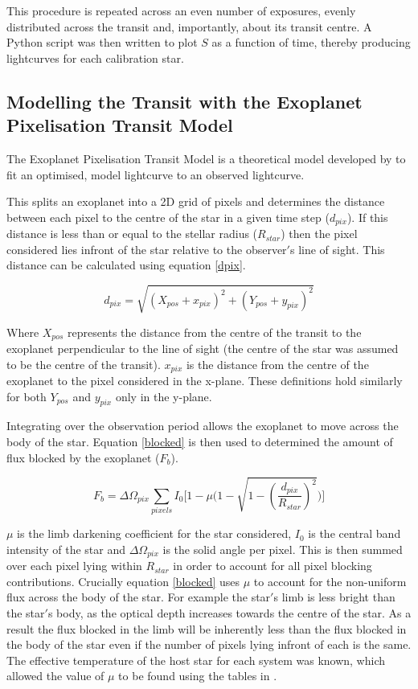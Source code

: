 \documentclass{report}
\begin{document}
This procedure is repeated across an even number of exposures, evenly distributed across the transit and, importantly, about its transit centre. A Python script was then written to plot $S$ as a function of time, thereby producing lightcurves for each calibration star.

\subsection{Modelling the Transit with the Exoplanet Pixelisation Transit Model}

The Exoplanet Pixelisation Transit Model is a theoretical model developed by \textcite{model} to fit an optimised, model lightcurve to an observed lightcurve.

This splits an exoplanet into a 2D grid of pixels and determines the distance between each pixel to the centre of the star in a given time step ($d_{pix}$). If this distance is less than or equal to the stellar radius ($R_{star}$) then the pixel considered lies infront of the star relative to the observer$'$s line of sight. This distance can be calculated using equation \ref{dpix}.

\begin{equation} \label{dpix}
    d_{pix} = \sqrt{(X_{pos} + x_{pix})^2 + (Y_{pos} + y_{pix})^2}
\end{equation}

Where $X_{pos}$ represents the distance from the centre of the transit to the exoplanet perpendicular to the line of sight (the centre of the star was assumed to be the centre of the transit). $x_{pix}$ is the distance from the centre of the exoplanet to the pixel considered in the x-plane. These definitions hold similarly for both $Y_{pos}$ and $y_{pix}$ only in the y-plane.

Integrating over the observation period allows the exoplanet to move across the body of the star. Equation \ref{blocked} is then used to determined the amount of flux blocked by the exoplanet ($F_{b}$). 

\begin{equation} \label{blocked}
    F_{b} = \Delta \Omega_{pix} \sum_{pixels} I_{0}\Bigg[1-\mu\Bigg(1-\sqrt{1-\left(\frac{d_{pix}}{R_{star}}\right)^{2}}\Bigg)\Bigg]
\end{equation}

$\mu$ is the limb darkening coefficient for the star considered, $I_{0}$ is the central band intensity of the star and $\Delta\Omega_{pix}$ is the solid angle per pixel. This is then summed over each pixel lying within $R_{star}$ in order to account for all pixel blocking contributions. Crucially equation \ref{blocked} uses $\mu$ to account for the non-uniform flux across the body of the star. For example the star$'$s limb is less bright than the star$'$s body, as the optical depth increases towards the centre of the star. As a result the flux blocked in the limb will be inherently less than the flux blocked in the body of the star even if the number of pixels lying infront of each is the same. The effective temperature of the host star for each system was known, which allowed the value of $\mu$ to be found using the tables in \textcite{vanhamme}.
\end{document}
